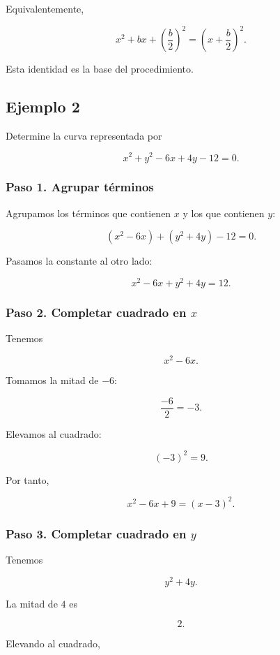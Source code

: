 \documentclass[12pt]{article}
\theoremstyle{plain}
\theoremstyle{definition}
\theoremstyle{remark}
\begin{document}
{Equivalentemente,

\[
x^2+bx+\left(\frac{b}{2}\right)^2
=
\left(x+\frac{b}{2}\right)^2.
\]

Esta identidad es la base del procedimiento.

\subsection*{Ejemplo 2}

Determine la curva representada por

\[
x^2+y^2-6x+4y-12=0.
\]

\subsubsection*{Paso 1. Agrupar términos}

Agrupamos los términos que contienen \(x\) y los que contienen \(y\):

\[
(x^2-6x)+(y^2+4y)-12=0.
\]

Pasamos la constante al otro lado:

\[
x^2-6x+y^2+4y=12.
\]

\subsubsection*{Paso 2. Completar cuadrado en \(x\)}

Tenemos

\[
x^2-6x.
\]

Tomamos la mitad de \(-6\):

\[
\frac{-6}{2}=-3.
\]

Elevamos al cuadrado:

\[
(-3)^2=9.
\]

Por tanto,

\[
x^2-6x+9=(x-3)^2.
\]

\subsubsection*{Paso 3. Completar cuadrado en \(y\)}

Tenemos

\[
y^2+4y.
\]

La mitad de \(4\) es

\[
2.
\]

Elevando al cuadrado,

}
\end{document}
